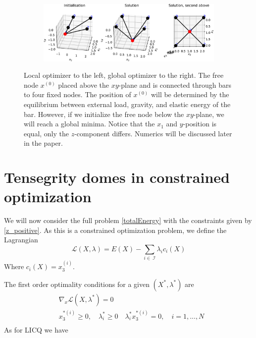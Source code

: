 \begin{figure}
\begin{subfigure}{.5\textwidth}
\end{subfigure}%
\begin{subfigure}{.5\textwidth}
  \centering
  \includegraphics[width=1\linewidth]{Bilder/localminneg.pdf}
\end{subfigure}
\caption{Local optimizer to the left, global optimizer to the right. The free node $x^{(0)}$ placed above the $xy$-plane and is connected through bars to four fixed nodes. The position of $x^{(0)}$ will be determined by the equilibrium between external load, gravity, and elastic energy of the bar. However, if we initialize the free node below the $xy$-plane, we will reach a global minima. Notice that the $x_1$ and $y$-position is equal, only the $z$-component differs. Numerics will be discussed later in the paper. }
\label{fig:local_optimizer}
\end{figure}

\section{Tensegrity domes in constrained optimization}\label{sec:freestanding}
We will now consider the full problem \eqref{totalEnergy} with the constraints given by \eqref{z_positive}. As this is a constrained optimization problem, we define the Lagrangian \begin{equation}
    \mathcal{L}(X,\lambda) = E(X) - \sum_{i \in \ \mathcal{I}}\lambda_i c_i(X)
\end{equation}
Where $c_i(X) = x^{(i)}_3$.

The first order optimality conditions for a given $(X^*,\lambda^*)$ are \begin{equation}
\begin{aligned}
       &\nabla_x \mathcal{L}(X,\lambda^*)=0\\ 
       &x^{*(i)}_3 \geq 0,\quad \lambda_i^* \geq 0 \quad \lambda_i^* x^{*(i)}_3 = 0,\quad i = 1,...,N\\
\end{aligned}
\end{equation}
As for LICQ we have 


